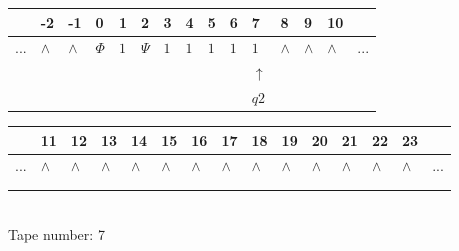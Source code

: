 \documentclass[11pt]{article}
\begin{document}
\begin{table}[H]
\centering
\begin{tabular}{lllllllllllllll}
 & -2 & -1 & 0 & 1 & 2 & 3 & 4 & 5 & 6 & 7 & 8 & 9 & 10 & \\
\hline
$...$ & \multicolumn{1}{|l|}{$\wedge$} & \multicolumn{1}{|l|}{$\wedge$} & \multicolumn{1}{|l|}{$\Phi$} & \multicolumn{1}{|l|}{$1$} & \multicolumn{1}{|l|}{$\Psi$} & \multicolumn{1}{|l|}{$1$} & \multicolumn{1}{|l|}{$1$} & \multicolumn{1}{|l|}{$1$} & \multicolumn{1}{|l|}{$1$} & \multicolumn{1}{|l|}{$1$} & \multicolumn{1}{|l|}{$\wedge$} & \multicolumn{1}{|l|}{$\wedge$} & \multicolumn{1}{|l|}{$\wedge$} & $...$\\
\hline
&  &  &  &  &  &  &  &  &  & $\uparrow$ &  &  &  &  \\
&  &  &  &  &  &  &  &  &  & $ q2 $ &  &  &  &  \\
\end{tabular}
\begin{tabular}{lllllllllllllll}
 & 11 & 12 & 13 & 14 & 15 & 16 & 17 & 18 & 19 & 20 & 21 & 22 & 23 & \\
\hline
$...$ & \multicolumn{1}{|l|}{$\wedge$} & \multicolumn{1}{|l|}{$\wedge$} & \multicolumn{1}{|l|}{$\wedge$} & \multicolumn{1}{|l|}{$\wedge$} & \multicolumn{1}{|l|}{$\wedge$} & \multicolumn{1}{|l|}{$\wedge$} & \multicolumn{1}{|l|}{$\wedge$} & \multicolumn{1}{|l|}{$\wedge$} & \multicolumn{1}{|l|}{$\wedge$} & \multicolumn{1}{|l|}{$\wedge$} & \multicolumn{1}{|l|}{$\wedge$} & \multicolumn{1}{|l|}{$\wedge$} & \multicolumn{1}{|l|}{$\wedge$} & $...$\\
\hline
&  &  &  &  &  &  &  &  &  &  &  &  &  &  \\
&  &  &  &  &  &  &  &  &  &  &  &  &  &  \\
\end{tabular}
\\
Tape number: 7
\noindent\makebox[\linewidth]{\hdashrule{\textwidth}{1pt}{1pt}}\end{table}
\clearpage
\end{document}
